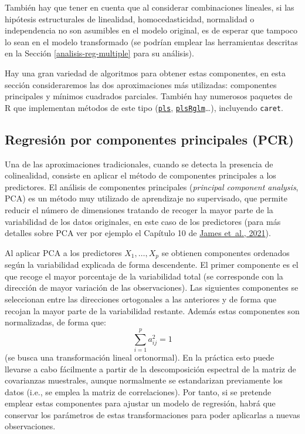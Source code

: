 \documentclass[
]{book}
\theoremstyle{break}
\theoremstyle{nonumberplain}
\begin{document}
También hay que tener en cuenta que al considerar combinaciones lineales, si las hipótesis estructurales de linealidad, homocedasticidad, normalidad o independencia no son asumibles en el modelo original, es de esperar que tampoco lo sean en el modelo transformado (se podrían emplear las herramientas descritas en la Sección \ref{analisis-reg-multiple} para su análisis).

Hay una gran variedad de algoritmos para obtener estas componentes, en esta sección consideraremos las dos aproximaciones más utilizadas: componentes principales y mínimos cuadrados parciales.
También hay numerosos paquetes de R que implementan métodos de este tipo (\href{https://mevik.net/work/software/pls.html}{\texttt{pls}}, \href{https://github.com/fbertran/plsRglm}{\texttt{plsRglm}}\ldots), incluyendo \texttt{caret}.

\hypertarget{regresiuxf3n-por-componentes-principales-pcr}{%
\subsection{Regresión por componentes principales (PCR)}\label{regresiuxf3n-por-componentes-principales-pcr}}

Una de las aproximaciones tradicionales, cuando se detecta la presencia de colinealidad, consiste en aplicar el método de componentes principales a los predictores.
El análisis de componentes principales (\emph{principal component analysis}, PCA) es un método muy utilizado de aprendizaje no supervisado, que permite reducir el número de dimensiones tratando de recoger la mayor parte de la variabilidad de los datos originales, en este caso de los predictores (para más detalles sobre PCA ver por ejemplo el Capítulo 10 de \protect\hyperlink{ref-james2021introduction}{James et~al., 2021}).

Al aplicar PCA a los predictores \(X_1, \ldots, X_p\) se obtienen componentes ordenados según la variabilidad explicada de forma descendente.
El primer componente es el que recoge el mayor porcentaje de la variabilidad total (se corresponde con la dirección de mayor variación de las observaciones).
Las siguientes componentes se seleccionan entre las direcciones ortogonales a las anteriores y de forma que recojan la mayor parte de la variabilidad restante.
Además estas componentes son normalizadas, de forma que:
\[\sum_{i=1}^p a_{ij}^2 = 1\]
(se busca una transformación lineal ortonormal).
En la práctica esto puede llevarse a cabo fácilmente a partir de la descomposición espectral de la matriz de covarianzas muestrales, aunque normalmente se estandarizan previamente los datos (i.e., se emplea la matriz de correlaciones).
Por tanto, si se pretende emplear estas componentes para ajustar un modelo de regresión, habrá que conservar los parámetros de estas transformaciones para poder aplicarlas a nuevas observaciones.
\end{document}
